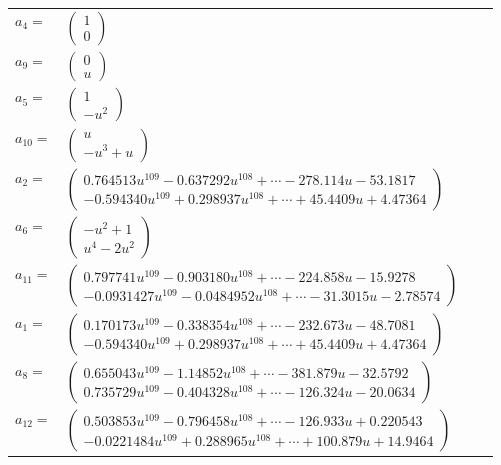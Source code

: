 \documentclass[1p]{elsarticle_modified}
\theoremstyle{definition}
\begin{document}
\begin{tabular}{m{7pt} m{180pt} m{7pt} m{180pt} }
\flushright $a_{4}=$&$\begin{pmatrix}1\\0\end{pmatrix}$ \\
\flushright $a_{9}=$&$\begin{pmatrix}0\\u\end{pmatrix}$ \\
\flushright $a_{5}=$&$\begin{pmatrix}1\\- u^2\end{pmatrix}$ \\
\flushright $a_{10}=$&$\begin{pmatrix}u\\- u^3+u\end{pmatrix}$ \\
\flushright $a_{2}=$&$\begin{pmatrix}0.764513 u^{109}-0.637292 u^{108}+\cdots-278.114 u-53.1817\\-0.594340 u^{109}+0.298937 u^{108}+\cdots+45.4409 u+4.47364\end{pmatrix}$ \\
\flushright $a_{6}=$&$\begin{pmatrix}- u^2+1\\u^4-2 u^2\end{pmatrix}$ \\
\flushright $a_{11}=$&$\begin{pmatrix}0.797741 u^{109}-0.903180 u^{108}+\cdots-224.858 u-15.9278\\-0.0931427 u^{109}-0.0484952 u^{108}+\cdots-31.3015 u-2.78574\end{pmatrix}$ \\
\flushright $a_{1}=$&$\begin{pmatrix}0.170173 u^{109}-0.338354 u^{108}+\cdots-232.673 u-48.7081\\-0.594340 u^{109}+0.298937 u^{108}+\cdots+45.4409 u+4.47364\end{pmatrix}$ \\
\flushright $a_{8}=$&$\begin{pmatrix}0.655043 u^{109}-1.14852 u^{108}+\cdots-381.879 u-32.5792\\0.735729 u^{109}-0.404328 u^{108}+\cdots-126.324 u-20.0634\end{pmatrix}$ \\
\flushright $a_{12}=$&$\begin{pmatrix}0.503853 u^{109}-0.796458 u^{108}+\cdots-126.933 u+0.220543\\-0.0221484 u^{109}+0.288965 u^{108}+\cdots+100.879 u+14.9464\end{pmatrix}$ \\

\end{tabular}
\end{document}

